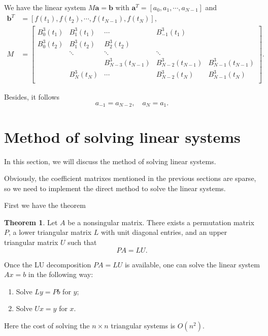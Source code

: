 \documentclass[a4paper]{article}
\theoremstyle{definition}
\newtheorem{theorem}{Theorem}
\begin{document}
We have the linear system $M\mathbf{a} = \mathbf{b}$ with $\mathbf{a}^T = [a_0, a_1, \cdots, a_{N - 1}]$ and
\begin{equation}
  \begin{aligned}
    \mathbf{b}^T &= [f(t_1), f(t_2), \cdots, f(t_{N - 1}), f(t_N)], \\
    M &= \begin{bmatrix}
      B_0^3(t_1) & B_1^3(t_1) &  \cdots  &  B_{-1}^3(t_1) &  \\
      B_0^3(t_2) & B_1^3(t_2) & B_2^3(t_2) &    &    \\
        &  \ddots &  \ddots & \ddots &    \\
        &    & B_{N - 3}^3(t_{N - 1}) & B_{N - 2}^3(t_{N - 1}) & B_{N - 1}^3(t_{N - 1}) \\
        & B_N^3(t_N) & \cdots &  B_{N - 2}^3(t_N) & B_{N - 1}^3(t_N) \\
    \end{bmatrix}.
  \end{aligned}
  \label{eq:periodic-cubic-b-spline-linear-system}
\end{equation}

Besides, it follows
\begin{equation}
  a_{-1} = a_{N - 2},\quad a_N = a_1.
  \label{eq:periodic-cubic-b-spline-coefficients}
\end{equation}

\section{Method of solving linear systems}

In this section, we will discuss the method of solving linear systems. 

Obviously, the coefficient matrixes mentioned in the previous sections are sparse, so we need to implement the direct method to solve the linear systems. 

First we have the theorem 
\begin{theorem}
  Let $A$ be a nonsingular matrix. There exists a permutation matrix $P$, a lower triangular matrix $L$ with unit diagonal entries, and an upper triangular matrix $U$ such that 
  \begin{equation}
    PA = LU.
    \label{eq:lu-decomposition}
  \end{equation}
\end{theorem}

Once the LU decomposition $PA = LU$ is available, one can solve the linear system $Ax = b$ in the following way:
\begin{enumerate}
  \item Solve $Ly = Pb$ for $y$;
  \item Solve $Ux = y$ for $x$.
\end{enumerate}
Here the cost of solving the $n \times n$ triangular systems is $O(n^2)$. 
\end{document}
